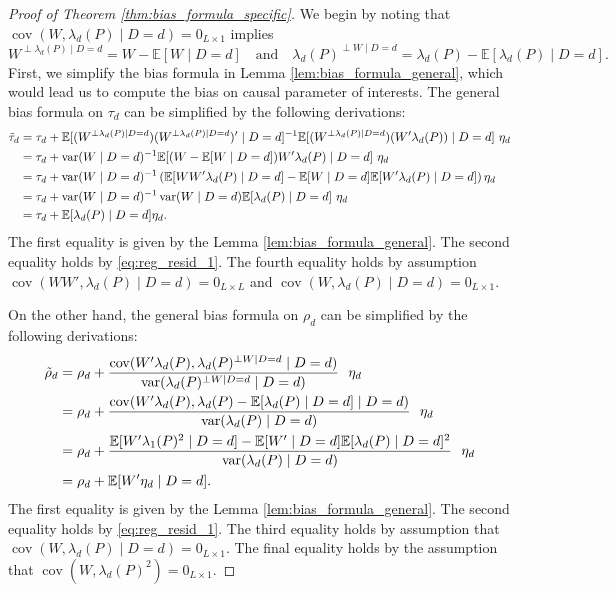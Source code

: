 \documentclass[11pt]{article}
\theoremstyle{definition}
\DeclareMathOperator{\cov}{cov}
\DeclareMathOperator{\var}{var}
\newcommand{\Exp}{\ensuremath{\mathbb{E}}} %
\newcommand{\0}{\ensuremath{\mathbf{0}}}
\begin{document}
\begin{bibunit}
%
\begin{proof}[Proof of Theorem \ref{thm:bias_formula_specific}]
We begin by noting that $\cov(W, \lambda_d(P)\mid D=d) = 0_{L\times 1}$ implies 
\begin{equation}
\label{eq:reg_resid_1}
    W^{\perp \lambda_d(P)\mid D=d} = W - \Exp[W\mid D=d] \quad \text{and} \quad \lambda_d(P)^{\perp W\mid D=d} = \lambda_d(P) - \Exp[\lambda_d(P)\mid D=d].
\end{equation}
%
%
%
%
%
%
%
%
%
%
%
%
%
%
First, we simplify the bias formula in Lemma \ref{lem:bias_formula_general}, which would lead us to compute the bias on causal parameter of interests. The general bias formula on $\tau_d$ can be simplified by the following derivations:
\begin{align}
    \tilde{\tau}_d
    &= \tau_d + \Exp[(W^{\perp \lambda_d(P)\mid D=d})(W^{\perp \lambda_d(P)\mid D=d})'\mid D=d]^{-1}\Exp[(W^{\perp \lambda_d(P)\mid D=d})(W'\lambda_d(P))\mid D=d]~\eta_d  \notag \\
    &= \tau_d + \var(W\mid D=d)^{-1}\Exp[(W-\Exp[W\mid D=d])W'\lambda_d(P)\mid D=d] ~\eta_d \notag \\
    &= \tau_d + \var(W\mid D=d)^{-1}\left(\Exp[WW'\lambda_d(P)\mid D=d] - \Exp[W\mid D=d]\Exp[W'\lambda_d(P)\mid D=d]\right) \eta_d \notag \\
    &= \tau_d + \var(W\mid D=d)^{-1}\var(W\mid D=d) \Exp[\lambda_d(P)\mid D=d] ~\eta_d \notag \\
    &= \tau_d + \Exp[\lambda_d(P)\mid D=d] \eta_d. \label{eq:bias_tau}
\end{align}
The first equality is given by the Lemma \ref{lem:bias_formula_general}. The second equality holds by \eqref{eq:reg_resid_1}. The fourth equality holds by assumption $\cov(WW',\lambda_d(P)\mid D=d) = 0_{L\times L}$ and $\cov(W,\lambda_d(P)\mid D=d) = 0_{L\times 1}$. 

On the other hand, the general bias formula on $\rho_d$ can be simplified by the following derivations:
\begin{align}
    \tilde{\rho}_d
    &= \rho_d + \frac{\cov(W'\lambda_d(P), \lambda_d(P)^{\perp W\mid D=d} \mid D=d)}{\var(\lambda_d(P)^{\perp W\mid D=d}\mid D=d)} ~~\eta_d \notag \\
    &= \rho_d + \frac{\cov(W'\lambda_d(P), \lambda_d(P) - \Exp[\lambda_d(P)\mid D=d]\mid D=d)}{\var(\lambda_d(P)\mid D=d)}~~\eta_d \notag \\
    &= \rho_d + \frac{\Exp[W'\lambda_1(P)^2\mid D=d] - \Exp[W'\mid D=d]\Exp[\lambda_d(P)\mid D=d]^2}{\var(\lambda_d(P)\mid D=d)}~~\eta_d \notag \\
    &= \rho_d + \Exp[W'\eta_d\mid D=d]. \label{eq:bias_rho}
\end{align}
The first equality is given by the Lemma \ref{lem:bias_formula_general}. The second equality holds by \eqref{eq:reg_resid_1}. The third equality holds by assumption that $\cov(W, \lambda_d(P)\mid D=d) = 0_{L\times 1}$. The final equality holds by the assumption that $\cov(W, \lambda_d(P)^2) = 0_{L\times 1}$.


\end{proof}
\end{bibunit}
\end{document}
